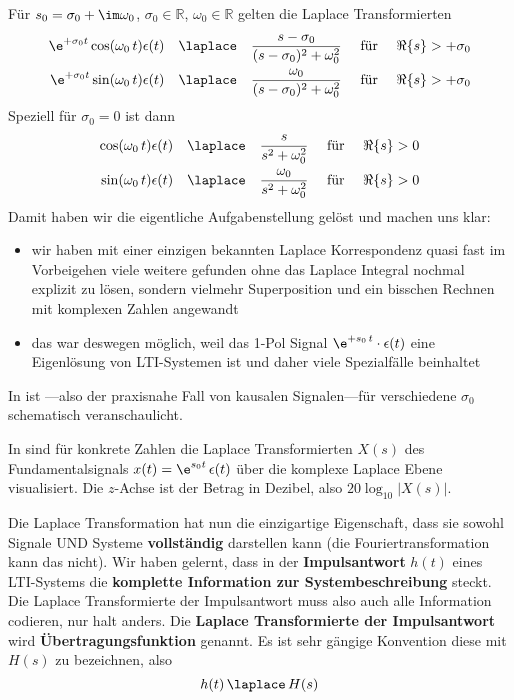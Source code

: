 \begin{Loesung}
Für $s_0=\sigma_0 + \im \omega_0$,
$\sigma_0\in\mathbb{R}$,
$\omega_0\in\mathbb{R}$
gelten die Laplace Transformierten
\begin{align}
\label{eq:31AEFEF90B}
\e^{+\sigma_0 t} \cos(\omega_0 \, t) \epsilon(t)
\quad \laplace \quad
\frac{s-\sigma_0}{(s-\sigma_0)^2+\omega_0^2}
\quad\text{ für } \quad\Re\{s\} >  +\sigma_0
\\
\e^{+\sigma_0 t} \sin(\omega_0 \, t) \epsilon(t)
\quad \laplace \quad
\frac{\omega_0}{(s-\sigma_0)^2+\omega_0^2}
\quad\text{ für } \quad\Re\{s\} >  +\sigma_0
\end{align}
Speziell für $\sigma_0=0$ ist dann
\begin{align}
\cos(\omega_0 \, t) \epsilon(t)
\quad \laplace \quad
\frac{s}{s^2+\omega_0^2}
\quad\text{ für } \quad\Re\{s\} > 0
\\
\sin(\omega_0 \, t) \epsilon(t)
\quad \laplace \quad
\frac{\omega_0}{s^2+\omega_0^2}
\quad\text{ für } \quad\Re\{s\} > 0
\end{align}
%
Damit haben wir die eigentliche Aufgabenstellung gelöst und machen uns klar:
\begin{itemize}
\item wir haben mit einer einzigen bekannten Laplace Korrespondenz
quasi fast im Vorbeigehen viele weitere gefunden
ohne das Laplace Integral nochmal explizit zu lösen, sondern vielmehr Superposition
und ein bisschen Rechnen mit komplexen Zahlen angewandt
\item das war deswegen möglich, weil das 1-Pol Signal
$\e^{+s_0 \, t} \cdot \epsilon(t)$ eine Eigenlösung von LTI-Systemen ist und
daher viele Spezialfälle beinhaltet
\end{itemize}

In  ist ---also der praxisnahe Fall von
kausalen Signalen---für verschiedene $\sigma_0$ schematisch veranschaulicht.

In  sind für konkrete Zahlen die Laplace
Transformierten $X(s)$ des Fundamentalsignals $x(t)=\e^{s_0 t}\,\epsilon(t)$
über die komplexe Laplace Ebene visualisiert.
Die $z$-Achse ist der Betrag in Dezibel, also
$20 \log_{10}|X(s)|$.

\textbf{}
Die Laplace Transformation hat nun die einzigartige Eigenschaft, dass sie
sowohl Signale UND Systeme \textbf{vollständig} darstellen kann
(die Fouriertransformation kann das nicht).
%
Wir haben gelernt, dass in der \textbf{Impulsantwort} $h(t)$ eines LTI-Systems die
\textbf{komplette Information zur Systembeschreibung} steckt.
%
Die Laplace Transformierte der Impulsantwort
muss also auch alle Information codieren, nur halt anders. Die
\textbf{Laplace Transformierte der Impulsantwort} wird \textbf{Übertragungsfunktion} genannt.
Es ist sehr gängige Konvention diese mit $H(s)$ zu bezeichnen, also
\begin{equation}
h(t) \, \laplace \, H(s)
\end{equation}
%


\end{Loesung}
